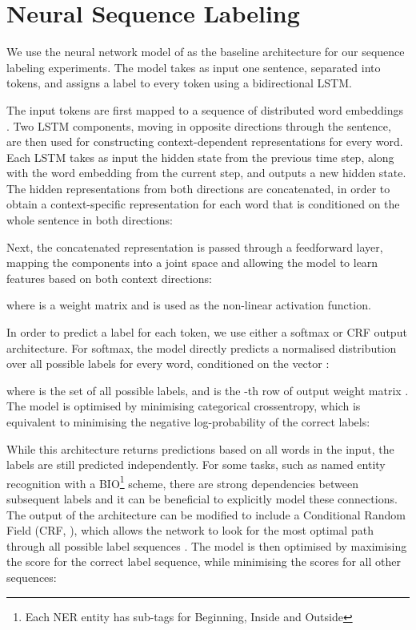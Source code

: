 \documentclass[11pt,a4paper]{article}
\begin{document}
\section{Neural Sequence Labeling}
\label{sec:seqlab}

We use the neural network model of  as the baseline architecture for our sequence labeling experiments. 
The model takes as input one sentence, separated into tokens, and assigns a label to every token using a bidirectional LSTM.

The input tokens are first mapped to a sequence of distributed word embeddings . 
Two LSTM \cite{Hochreiter1997} components, moving in opposite directions through the sentence, are then used for constructing context-dependent representations for every word. 
Each LSTM takes as input the hidden state from the previous time step, along with the word embedding from the current step, and outputs a new hidden state.
The hidden representations from both directions are concatenated, in order to obtain a context-specific representation for each word that is conditioned on the whole sentence in both directions:





Next, the concatenated representation is passed through a feedforward layer, mapping the components into a joint space and allowing the model to learn features based on both context directions:



\noindent where  is a weight matrix and  is used as the non-linear activation function.

In order to predict a label for each token, we use either a softmax or CRF output architecture.
For softmax, the model directly predicts a normalised distribution over all possible labels for every word, conditioned on the vector :



\noindent where  is the set of all possible labels, and  is the -th row of output weight matrix . The model is optimised by minimising categorical crossentropy, which is equivalent to minimising the negative log-probability of the correct labels:





While this architecture returns predictions based on all words in the input, the labels are still predicted independently. For some tasks, such as named entity recognition with a BIO\footnote{Each NER entity has sub-tags for Beginning, Inside and Outside} scheme, there are strong dependencies between subsequent labels and it can be beneficial to explicitly model these connections. The output of the architecture can be modified to include a Conditional Random Field (CRF, ), which allows the network to look for the most optimal path through all possible label sequences \cite{Huang2015,Lample2016}. The model is then optimised by maximising the score for the correct label sequence, while minimising the scores for all other sequences:
\end{document}

